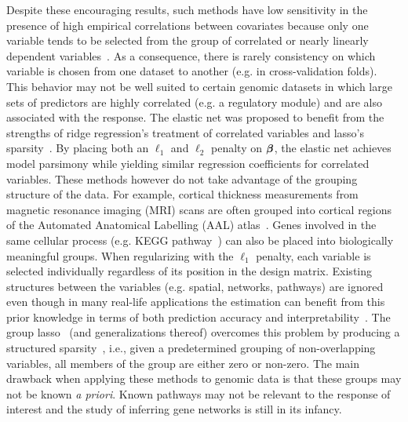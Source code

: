 Despite these encouraging results, such methods have low sensitivity in the presence of high empirical correlations between covariates because only one variable tends to be selected from the group of correlated or nearly linearly dependent variables~\citep{buhlmann2013correlated}. 
As a consequence, there is rarely consistency on which variable is chosen from one dataset to another (e.g. in cross-validation folds). This behavior may not be well suited to certain genomic datasets in which large sets of predictors are highly correlated (e.g. a regulatory module) and are also associated with the response. 
The elastic net was proposed to benefit from the strengths of ridge regression's treatment of correlated variables and lasso's sparsity~\citep{zou2005regularization}. By placing both an $\ell_1$ and $\ell_2$ penalty on $\boldsymbol{\beta}$, the elastic net achieves model parsimony while yielding similar regression coefficients for correlated variables. 
These methods however do not take advantage of the grouping structure of the data. For example, cortical thickness measurements from magnetic resonance imaging (MRI) scans are often grouped into cortical regions of the Automated Anatomical Labelling (AAL) atlas~\citep{tzourio2002automated}. 
Genes involved in the same cellular process (e.g. KEGG pathway~\citep{kanehisa2008kegg}) can also be placed into biologically meaningful groups. When regularizing with the $\ell_1$ penalty, each variable is selected individually regardless of its position in the design matrix. 
Existing structures between the variables (e.g. spatial, networks, pathways) are ignored even though in many real-life applications the estimation can benefit from this prior knowledge in terms of both prediction accuracy and interpretability~\citep{bach2012structured}. 
The group lasso~\citep{yuan2006model} (and generalizations thereof) overcomes this problem by producing a structured sparsity~\citep{bach2012structured}, i.e., given a predetermined grouping of non-overlapping variables, all members of the group are either zero or non-zero. 
The main drawback when applying these methods to genomic data is that these groups may not be known \textit{a priori}. Known pathways may not be relevant to the response of interest and the study of inferring gene networks is still in its infancy. 




